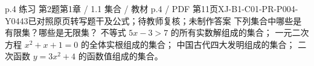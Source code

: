 \par\noindent\begin{minipage}{\linewidth}
\begin{bankitem}{p.4 练习 第2题}{第1章 / 1.1 集合 / 教材 p.4 / PDF 第11页}{XJ-B1-C01-PR-P004-Y0443}{已对照原页转写题干及公式；待教师复核；未制作答案}
下列集合中哪些是有限集？哪些是无限集？
不等式 $5x-3>7$ 的所有实数解组成的集合；
一元二次方程 $x^2+x+1=0$ 的全体实根组成的集合；
中国古代四大发明组成的集合；
二次函数 $y=3x^2+4$ 的函数值组成的集合。
\end{bankitem}
\end{minipage}\par\medskip
